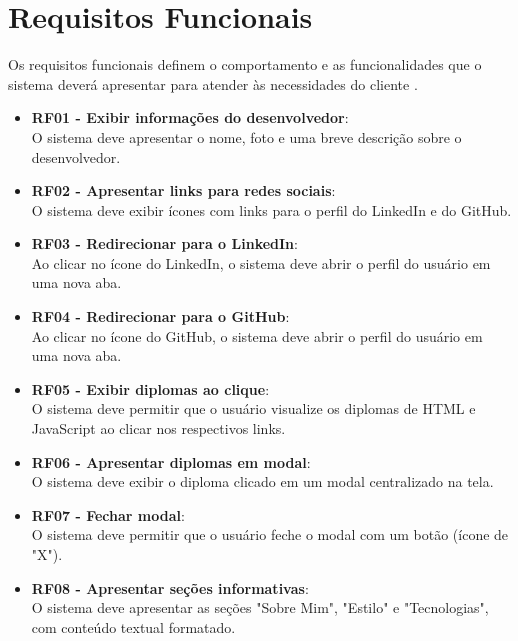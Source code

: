 \section{Requisitos Funcionais}
\label{sec:reqfuncionais}

Os requisitos funcionais definem o comportamento e as funcionalidades que o sistema deverá apresentar para atender às necessidades do cliente \cite{Pressman2016,Sommerville2011}.


\begin{itemize}
    \item \textbf{RF01 - Exibir informações do desenvolvedor}:\\
    O sistema deve apresentar o nome, foto e uma breve descrição sobre o desenvolvedor.

    \item \textbf{RF02 - Apresentar links para redes sociais}:\\
    O sistema deve exibir ícones com links para o perfil do LinkedIn e do GitHub.

    \item \textbf{RF03 - Redirecionar para o LinkedIn}:\\
    Ao clicar no ícone do LinkedIn, o sistema deve abrir o perfil do usuário em uma nova aba.

    \item \textbf{RF04 - Redirecionar para o GitHub}:\\
    Ao clicar no ícone do GitHub, o sistema deve abrir o perfil do usuário em uma nova aba.

    \item \textbf{RF05 - Exibir diplomas ao clique}:\\
    O sistema deve permitir que o usuário visualize os diplomas de HTML e JavaScript ao clicar nos respectivos links.

    \item \textbf{RF06 - Apresentar diplomas em modal}:\\
    O sistema deve exibir o diploma clicado em um modal centralizado na tela.

    \item \textbf{RF07 - Fechar modal}:\\
    O sistema deve permitir que o usuário feche o modal com um botão (ícone de "X").

    \item \textbf{RF08 - Apresentar seções informativas}:\\
    O sistema deve apresentar as seções "Sobre Mim", "Estilo" e "Tecnologias", com conteúdo textual formatado.
\end{itemize}

